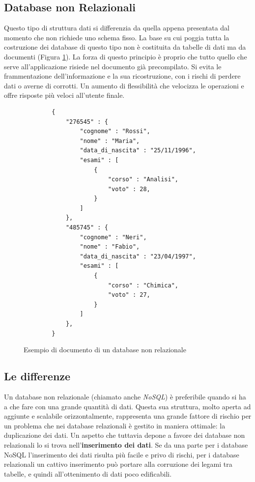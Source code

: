 \subsection{Database non Relazionali}
Questo tipo di struttura dati si differenzia da quella appena presentata dal momento che non richiede uno schema fisso. La base su cui poggia tutta la costruzione dei database di questo tipo non è costituita da tabelle di dati ma da documenti (Figura \ref{fig:nonrelational-database}). La forza di questo principio è proprio che tutto quello che serve all’applicazione risiede nel documento già precompilato. Si evita le frammentazione dell’informazione e la sua ricostruzione, con i rischi di perdere dati o averne di corrotti. Un aumento di flessibilità che velocizza le operazioni e offre risposte più veloci all'utente finale.
\begin{figure}[H]
    \centering
    \begin{verbatim}
        {
            "276545" : {
                "cognome" : "Rossi",
                "nome" : "Maria",
                "data_di_nascita" : "25/11/1996",
                "esami" : [
                    {
                        "corso" : "Analisi",
                        "voto" : 28,
                    }
                ]
            },
            "485745" : {
                "cognome" : "Neri",
                "nome" : "Fabio",
                "data_di_nascita" : "23/04/1997",
                "esami" : [
                    {
                        "corso" : "Chimica",
                        "voto" : 27,
                    }
                ]
            },
        }
    \end{verbatim}
    \caption{Esempio di documento di un database non relazionale}
    \label{fig:nonrelational-database}
\end{figure}

\subsection{Le differenze}
Un database non relazionale (chiamato anche \textit{NoSQL}) è preferibile quando si ha a che fare con una grande quantità di dati. Questa sua struttura, molto aperta ad aggiunte e scalabile orizzontalmente, rappresenta una grande fattore di rischio per un problema che nei database relazionali è gestito in maniera ottimale: la duplicazione dei dati. Un aspetto che tuttavia depone a favore dei database non relazionali lo si trova nell'\textbf{inserimento dei dati}. Se da una parte per i database NoSQL l'inserimento dei dati risulta più facile e privo di rischi, per i database relazionali un cattivo inserimento può portare alla corruzione dei legami tra tabelle, e quindi all'ottenimento di dati poco edificabili. 

